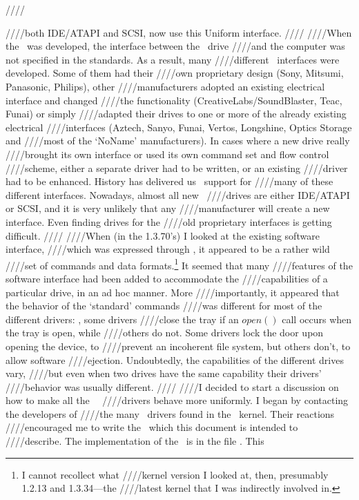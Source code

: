 ////\documentclass{article}
\begin{document}
////both IDE/ATAPI and SCSI, now use this Uniform interface.
////
////When the \cdrom\ was developed, the interface between the \cdrom\ drive
////and the computer was not specified in the standards. As a result, many
////different \cdrom\ interfaces were developed. Some of them had their
////own proprietary design (Sony, Mitsumi, Panasonic, Philips), other
////manufacturers adopted an existing electrical interface and changed
////the functionality (CreativeLabs/SoundBlaster, Teac, Funai) or simply
////adapted their drives to one or more of the already existing electrical
////interfaces (Aztech, Sanyo, Funai, Vertos, Longshine, Optics Storage and
////most of the `NoName' manufacturers). In cases where a new drive really
////brought its own interface or used its own command set and flow control
////scheme, either a separate driver had to be written, or an existing
////driver had to be enhanced. History has delivered us \cdrom\ support for
////many of these different interfaces. Nowadays, almost all new \cdrom\
////drives are either IDE/ATAPI or SCSI, and it is very unlikely that any
////manufacturer will create a new interface. Even finding drives for the
////old proprietary interfaces is getting difficult.
////
////When (in the 1.3.70's) I looked at the existing software interface,
////which was expressed through \cdromh, it appeared to be a rather wild
////set of commands and data formats.\footnote{I cannot recollect what
////kernel version I looked at, then, presumably 1.2.13 and 1.3.34---the
////latest kernel that I was indirectly involved in.} It seemed that many
////features of the software interface had been added to accommodate the
////capabilities of a particular drive, in an {\fo ad hoc\/} manner. More
////importantly, it appeared that the behavior of the `standard' commands
////was different for most of the different drivers: \eg, some drivers
////close the tray if an $open()$ call occurs when the tray is open, while
////others do not. Some drivers lock the door upon opening the device, to
////prevent an incoherent file system, but others don't, to allow software
////ejection. Undoubtedly, the capabilities of the different drives vary,
////but even when two drives have the same capability their drivers'
////behavior was usually different.
////
////I decided to start a discussion on how to make all the \linux\ \cdrom\
////drivers behave more uniformly. I began by contacting the developers of
////the many \cdrom\ drivers found in the \linux\ kernel. Their reactions
////encouraged me to write the \UCD\ which this document is intended to
////describe. The implementation of the \UCD\ is in the file \cdromc. This
\end{document}
